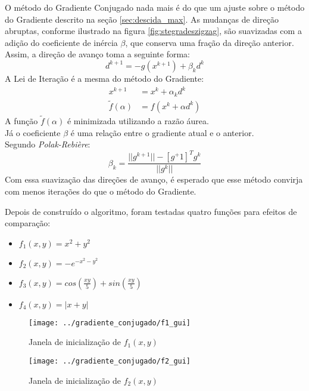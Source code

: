 O método do Gradiente Conjugado nada mais é do que um ajuste sobre o método do Gradiente descrito na seção \ref{sec:descida_max}. As mudanças de direção abruptas, conforme ilustrado na figura \ref{fig:stegradeszigzag}, são suavizadas com a adição do coeficiente de inércia $\beta$, que conserva uma fração da direção anterior. Assim, a direção de avanço toma a seguinte forma:
	\begin{equation}
	d^{k+1} = -g(x^{k+1}) + \beta_k d^k
	\end{equation}
A Lei de Iteração é a mesma do método do Gradiente:
		\begin{align}
			x^{k+1} &= x^k + \alpha_k d^k \\
			\tilde{f}(\alpha) &= f(x^k + \alpha d^k)
		\end{align}
A função $\tilde{f}(\alpha)$ é minimizada utilizando a razão áurea.\\
Já o coeficiente $\beta$ é uma relação entre o gradiente atual e o anterior.\\
		Segundo \textit{Polak-Rebière}:
		\begin{equation}
			\beta_k = \frac{||g^{k+1}|| - [g^+1]^T g^k}{||g^k||}
		\end{equation}
Com essa suavização das direções de avanço, é esperado que esse método convirja com menos iterações do que o método do Gradiente. 

Depois de construído o algoritmo, foram testadas quatro funções para efeitos de comparação:

\begin{itemize}
	\item $ f_1(x,y) = x^2 + y^2$
	\item $ f_2(x,y) = -e^{-x^2 -y^2}$
	\item $ f_3(x,y) = cos(\frac{xy}{5})+sin(\frac{xy}{5}) $
	\item $ f_4(x,y) = |x+y| $
\end{itemize}

\begin{figure}[H]
	\begin{center}
		\texttt{[image: ../gradiente\_conjugado/f1\_gui]}   
		\caption{Janela de inicialização de $ f_1(x,y) $}
		\label{fig:gradiente_conjugado_f1_gui}
	\end{center}
\end{figure}

\begin{figure}[H]
	\begin{center}
		\texttt{[image: ../gradiente\_conjugado/f2\_gui]}   
		\caption{Janela de inicialização de $ f_2(x,y) $}
		\label{fig:gradiente_conjugado_f2_gui}
	\end{center}
\end{figure}

